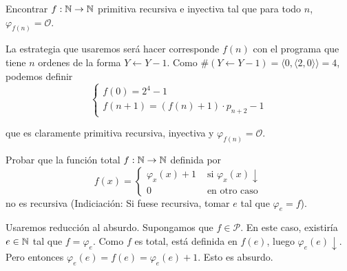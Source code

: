 \documentclass[twoside]{article}
\begin{document}
\newpage
\begin{ejercicio}{8}
Encontrar $f : \mathbb{N} \to \mathbb{N}$ primitiva recursiva e inyectiva tal que para todo $n$, $φ_{f(n)} = \mathcal{O}$.
\end{ejercicio}
\begin{solucion}
La estrategia que usaremos será hacer corresponde $f(n)$ con el programa que tiene $n$ ordenes de la forma $Y \leftarrow Y-1$. Como $\#(Y \leftarrow Y-1) = \langle 0, \langle 2,0\rangle \rangle = 4$, podemos definir
\[\begin{cases}
	f(0) = 2^4-1 \\
	f(n+1) = (f(n)+1)\cdot p_{n+2}-1
\end{cases}\]
\end{solucion}
que es claramente primitiva recursiva, inyectiva y $φ_{f(n)} = \mathcal{O}$.

\newpage
\begin{ejercicio}{9}
Probar que la función total $f : \mathbb{N} \to \mathbb{N}$ definida por
\[ f(x) = \begin{cases}
	φ_x(x)+1 &\text{ si }φ_x(x) \downarrow\\
	0 & \text{ en otro caso}
\end{cases}\]
no es recursiva (Indiciación: Si fuese recursiva, tomar $e$ tal que $φ_e = f$).
\end{ejercicio}
\begin{solucion}
Usaremos reducción al absurdo. Supongamos que $f \in \mathcal{P}$. En este caso, existiría $e \in \mathbb{N}$ tal que $f = φ_e$. Como $f$ es total, está definida en $f(e)$, luego $φ_e(e)\downarrow$. Pero entonces $φ_e(e) = f(e) = φ_e(e)+1$. Esto es absurdo.
\end{solucion}

\newpage
\end{document}
